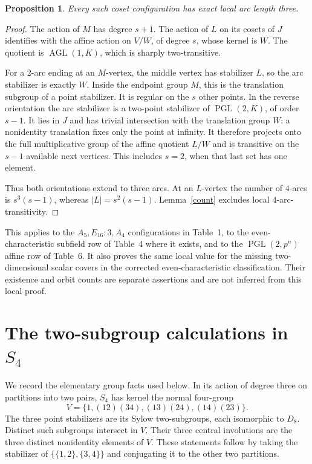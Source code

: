 \documentclass[11pt]{article}
\newtheorem{proposition}[lemma]{Proposition}
\newcommand{\PGL}{\operatorname{PGL}}
\begin{document}
\begin{proposition}\label{affine}
Every such coset configuration has exact local arc length three.
\end{proposition}
\begin{proof}
The action of $M$ has degree $s+1$. The action of $L$ on its cosets
of $J$ identifies with the affine action on $V/W$, of degree $s$,
whose kernel is $W$. The quotient is $\operatorname{AGL}(1,K)$,
which is sharply two-transitive.

For a $2$-arc ending at an $M$-vertex, the middle vertex has stabilizer
$L$, so the arc stabilizer is exactly $W$. Inside the endpoint group
$M$, this is the translation subgroup of a point stabilizer. It is
regular on the $s$ other points. In the reverse orientation the arc
stabilizer is a two-point stabilizer of $\PGL(2,K)$, of order $s-1$.
It lies in $J$ and has trivial intersection with the translation group
$W$: a nonidentity translation fixes only the point at infinity.
It therefore projects onto the full multiplicative group of the affine
quotient $L/W$ and is transitive on the $s-1$ available next vertices.
This includes $s=2$, when that last set has one element.

Thus both orientations extend to three arcs. At an $L$-vertex the
number of $4$-arcs is $s^3(s-1)$, whereas $|L|=s^2(s-1)$.
Lemma~\ref{count} excludes local $4$-arc-transitivity.
\end{proof}

This applies to the $A_5,E_{16}:3,A_4$ configurations in Table~1,
to the even-characteristic subfield row of Table~4 where it exists,
and to the $\PGL(2,p^n)$ affine row of Table~6. It also proves the
same local value for the missing two-dimensional scalar covers in the
corrected even-characteristic classification. Their existence and orbit
counts are separate assertions and are not inferred from this local proof.

\section{The two-subgroup calculations in $S_4$}
We record the elementary group facts used below. In its action of degree
three on partitions into two pairs, $S_4$ has kernel the normal four-group
\[
 V=\{1,(12)(34),(13)(24),(14)(23)\}.
\]
The three point stabilizers are its Sylow two-subgroups, each isomorphic
to $D_8$. Distinct such subgroups intersect in $V$. Their three central
involutions are the three distinct nonidentity elements of $V$.
These statements follow by taking the stabilizer of
$\{\{1,2\},\{3,4\}\}$ and conjugating it to the other two partitions.
\end{document}
